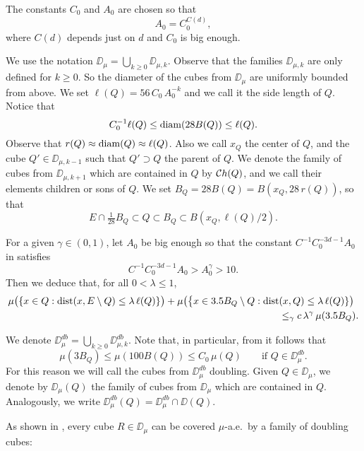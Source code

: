 \vv

\begin{rem}\label{rema00}
	The constants $C_0$ and $A_0$ are chosen so that
	$$A_0 = C_0^{C(d)},$$
	where $C(d)$ depends
	just on $d$ and $C_0$ is big enough.
\end{rem}

We use the notation $\DD_\mu=\bigcup_{k\geq0}\DD_{\mu,k}$. Observe that the families $\DD_{\mu,k}$ are only defined for $k\geq0$. So the diameter of the cubes from $\DD_\mu$ are uniformly
bounded from above.
We set
$\ell(Q)= 56\,C_0\,A_0^{-k}$ and we call it the side length of $Q$. Notice that 
$$C_0^{-1}\ell(Q)\leq {\rm diam}(28B(Q))\leq\ell(Q).$$
Observe that $r(Q)\approx{\rm diam}(Q)\approx\ell(Q)$.
Also we call $x_Q$ the center of $Q$, and the cube $Q'\in \DD_{\mu,k-1}$ such that $Q'\supset Q$ the parent of $Q$.
We denote the family of cubes from $\DD_{\mu,k+1}$ which are contained in $Q$ by ${\mathcal Ch}(Q)$, and we call their elements children or sons of $Q$.
We set
$B_Q=28 B(Q)=B(x_Q,28\,r(Q))$, so that 
$$E\cap \tfrac1{28}B_Q\subset Q\subset B_Q\subset B(x_Q,\ell(Q)/2).$$

For a given $\gamma\in(0,1)$, let $A_0$ be big enough so that the constant $C^{-1}C_0^{-3d-1}A_0$ in 
 satisfies 
$$C^{-1}C_0^{-3d-1}A_0>A_0^{\gamma}>10.$$
Then we deduce that, for all $0<\lambda\leq1$,
\begin{align}\label{eqfk490}
	\mu\bigl(\{x\in Q:{\rm dist}(x,E\setminus Q)\leq \lambda\,\ell(Q)\}\bigr) + 
	\mu\bigl(\bigl\{x\in 3.5B_Q\setminus Q:{\rm dist}&(x,Q)\leq \lambda\,\ell(Q)\}\bigr)\\
	&\leq_\gamma
	c\,\lambda^{\gamma}\,\mu(3.5B_Q).\nonumber
\end{align}

We denote
$\DD_\mu^{db}=\bigcup_{k\geq0}\DD_{\mu,k}^{db}$.
Note that, in particular, from  it follows that
\begin{equation}\label{eqdob*}
	\mu(3B_{Q})\leq \mu(100B(Q))\leq C_0\,\mu(Q)\qquad\mbox{if $Q\in\DD_\mu^{db}.$}
\end{equation}
For this reason we will call the cubes from $\DD_\mu^{db}$ doubling. 
Given $Q\in\DD_\mu$, we denote by $\DD_\mu(Q)$
the family of cubes from $\DD_\mu$ which are contained in $Q$. Analogously,
we write $\DD_\mu^{db}(Q) = \DD^{db}_\mu\cap\DD(Q)$. 


As shown in \cite[Lemma 5.28]{David-Mattila}, every cube $R\in\DD_\mu$ can be covered $\mu$-a.e.\
by a family of doubling cubes:
\vv

